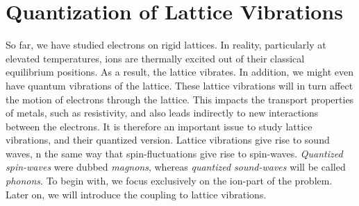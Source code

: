 \section{Quantization of Lattice Vibrations}

So far, we have studied electrons on rigid lattices. In reality, particularly at elevated temperatures, ions are thermally excited out of their classical equilibrium positions. As a result, the lattice vibrates.
In addition, we might even have quantum vibrations of the lattice. 
These lattice vibrations will in turn affect the motion of electrons through the lattice. 
This impacts the transport properties of metals, such as resistivity, and also leads indirectly to new interactions between the electrons. 
It is therefore an important issue to study lattice vibrations, and their quantized version.
Lattice vibrations give rise to sound waves, n the same way that spin-fluctuations give rise to spin-waves.
\emph{Quantized spin-waves} were dubbed \emph{magnons}, whereas \emph{quantized sound-waves} will be called \emph{phonons}.
To begin with, we focus exclusively on the ion-part of the problem. Later on, we will introduce the coupling to lattice vibrations. 

